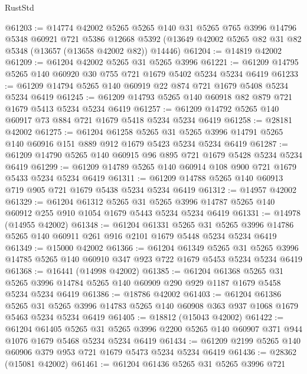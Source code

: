 \begin{lexlean}{RustStd}
\begin{coremodule}
@61203 := @14774
    @42002
    @5265
    @5265
    @140
    @31
    @5265
    @765
    @3996
    @14796
    @5348
    @60921
    @721
    @5386
    @12668
    @5392
    (@13649 @42002 @5265 @82 @31 @82 @5348 (@13657 (@13658 @42002 @82)) @14446)
@61204 := @14819 @42002
@61209 := @61204 @42002 @5265 @31 @5265 @3996
@61221 := @61209 @14795 @5265 @140 @60920 @30 @755 @721 @1679 @5402 @5234 @5234 @6419
@61233 := @61209 @14794 @5265 @140 @60919 @22 @874 @721 @1679 @5408 @5234 @5234 @6419
@61245 := @61209 @14793 @5265 @140 @60918 @82 @879 @721 @1679 @5413 @5234 @5234 @6419
@61257 := @61209 @14792 @5265 @140 @60917 @73 @884 @721 @1679 @5418 @5234 @5234 @6419
@61258 := @28181 @42002
@61275 := @61204
    @61258
    @5265
    @31
    @5265
    @3996
    @14791
    @5265
    @140
    @60916
    @151
    @889
    @912
    @1679
    @5423
    @5234
    @5234
    @6419
@61287 := @61209 @14790 @5265 @140 @60915 @96 @895 @721 @1679 @5428 @5234 @5234 @6419
@61299 := @61209 @14789 @5265 @140 @60914 @108 @900 @721 @1679 @5433 @5234 @5234 @6419
@61311 := @61209 @14788 @5265 @140 @60913 @719 @905 @721 @1679 @5438 @5234 @5234 @6419
@61312 := @14957 @42002
@61329 := @61204
    @61312
    @5265
    @31
    @5265
    @3996
    @14787
    @5265
    @140
    @60912
    @255
    @910
    @1054
    @1679
    @5443
    @5234
    @5234
    @6419
@61331 := @14978 (@14955 @42002)
@61348 := @61204
    @61331
    @5265
    @31
    @5265
    @3996
    @14786
    @5265
    @140
    @60911
    @261
    @916
    @2101
    @1679
    @5448
    @5234
    @5234
    @6419
@61349 := @15000 @42002
@61366 := @61204
    @61349
    @5265
    @31
    @5265
    @3996
    @14785
    @5265
    @140
    @60910
    @347
    @923
    @722
    @1679
    @5453
    @5234
    @5234
    @6419
@61368 := @16441 (@14998 @42002)
@61385 := @61204
    @61368
    @5265
    @31
    @5265
    @3996
    @14784
    @5265
    @140
    @60909
    @290
    @929
    @1187
    @1679
    @5458
    @5234
    @5234
    @6419
@61386 := @18786 @42002
@61403 := @61204
    @61386
    @5265
    @31
    @5265
    @3996
    @14783
    @5265
    @140
    @60908
    @363
    @937
    @1068
    @1679
    @5463
    @5234
    @5234
    @6419
@61405 := @18812 (@15043 @42002)
@61422 := @61204
    @61405
    @5265
    @31
    @5265
    @3996
    @2200
    @5265
    @140
    @60907
    @371
    @944
    @1076
    @1679
    @5468
    @5234
    @5234
    @6419
@61434 := @61209 @2199 @5265 @140 @60906 @379 @953 @721 @1679 @5473 @5234 @5234 @6419
@61436 := @28362 (@15081 @42002)
@61461 := @61204
    @61436
    @5265
    @31
    @5265
    @3996
    @721

\end{coremodule}
\end{lexlean}
